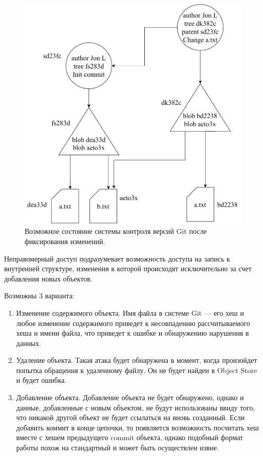 \begin{figure}[hbtp]
	\centering
	\includegraphics[width=\textwidth]{./img/git-commit.pdf}
	\caption{Возможное состояние системы контроля версий Git после фиксирования изменений.}
	\label{fig:git3}
\end{figure}

Неправомерный доступ подразумевает возможность доступа на запись к внутренней структуре, изменения в которой происходят исключительно за счет добавления новых объектов.

Возможны 3 варианта:
\begin{enumerate}
	\item Изменение содержимого объекта. Имя файла в системе Git --- его хеш и любое изменение содержимого приведет к несовпадению рассчитываемого хеша и имени файла, что приведет к ошибке и обнаружению нарушения в данных.
	\item Удаление объекта. Такая атака будет обнаружена в момент, когда произойдет попытка обращения к удаленному файлу. Он не будет найден в Object Store и будет ошибка.
	\item Добавление объекта. Добавление объекта не будет обнаружено, однако и данные, добавленные с новым объектом, не будут использованы ввиду того, что никакой другой объект не будет ссылаться на вновь созданный. Если добавить коммит в конце цепочки, то появляется возможность посчитать хеш вместе с хешем предыдущего commit объекта, однако подобный формат работы похож на стандартный и может быть осуществлен извне.
\end{enumerate}

